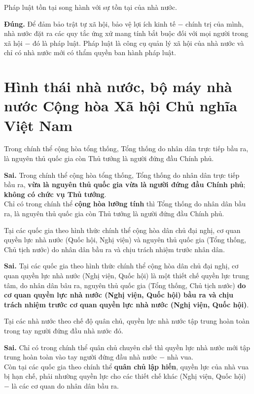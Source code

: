 \begin{ques}
Pháp luật tồn tại song hành với sự tồn tại của nhà nước.
\end{ques}
\begin{ans}
\textbf{Đúng.} Để đảm bảo trật tự xã hội, bảo vệ lợi ích kinh tế $-$ chính trị của mình, nhà nước đặt ra các quy tắc ứng xử mang tính bắt buộc đối với mọi người trong xã hội $-$ đó là pháp luật. Pháp luật là công cụ quản lý xã hội của nhà nước và chỉ có nhà nước mới có thẩm quyền ban hành pháp luật.
\end{ans}

\chapter{Hình thái nhà nước, bộ máy nhà nước Cộng hòa Xã hội Chủ nghĩa Việt Nam}
\begin{ques}
Trong chính thể cộng hòa tổng thống, Tổng thống do nhân dân trực tiếp bầu ra, là nguyên thủ quốc gia còn Thủ tướng là người đứng đầu Chính phủ.
\end{ques}
\begin{ans}
\textbf{Sai.} Trong chính thể cộng hòa tổng thống, Tổng thống do nhân dân trực tiếp bầu ra, \textbf{vừa là nguyên thủ quốc gia vừa là người đứng đầu Chính phủ}; \textbf{không có chức vụ Thủ tướng}.\\
Chỉ có trong chính thể \textbf{cộng hòa lưỡng tính} thì Tổng thống do nhân dân bầu ra, là nguyên thủ quốc gia còn Thủ tướng là người đứng đầu Chính phủ.
\end{ans}

\begin{ques}
Tại các quốc gia theo hình thức chính thể cộng hòa dân chủ đại nghị, cơ quan quyền lực nhà nước (Quốc hội, Nghị viện) và nguyên thủ quốc gia (Tổng thống, Chủ tịch nước) do nhân dân bầu ra và chịu trách nhiệm trước nhân dân.
\end{ques}
\begin{ans}
\textbf{Sai.} Tại các quốc gia theo hình thức chính thể cộng hòa dân chủ đại nghị, cơ quan quyền lực nhà nước (Nghị viện, Quốc hội) là một thiết chế quyền lực trung tâm, do nhân dân bâu ra, nguyên thủ quốc gia (Tổng thống, Chủ tịch nước) \textbf{do cơ quan quyền lực nhà nước (Nghị viện, Quốc hội) bầu ra và chịu trách nhiệm trước cơ quan quyền lực nhà nước (Nghị viện, Quốc hội)}.
\end{ans}

\begin{ques}
Tại các nhà nước theo chế độ quân chủ, quyền lực nhà nước tập trung hoàn toàn trong tay người đứng đầu nhà nước đó.
\end{ques}
\begin{ans}
\textbf{Sai.} Chỉ có trong chính thể quân chủ chuyên chế thì quyền lực nhà nước mới tập trung hoàn toàn vào tay người đứng đầu nhà nước $-$ nhà vua.\\
Còn tại các quốc gia theo chính thể \textbf{quân chủ lập hiến}, quyền lực của nhà vua bị hạn chế, phải nhường quyền lực cho các thiết chế khác (Nghị viện, Quốc hội) $-$ là các cơ quan do nhân dân bầu ra.
\end{ans}

